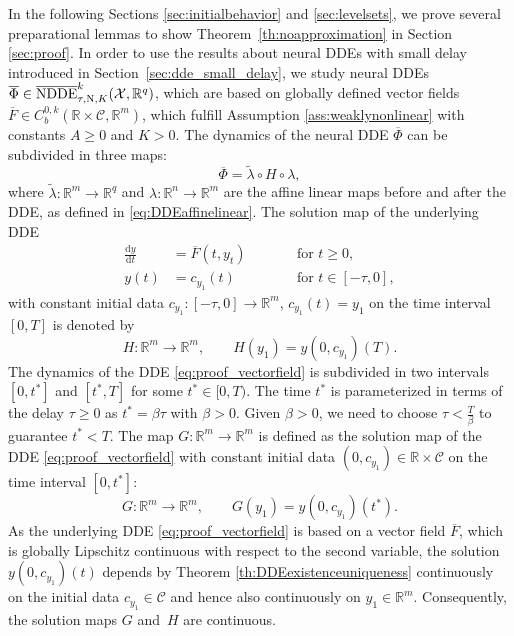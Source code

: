 \documentclass[10pt]{article}
\numberwithin{equation}{section}
\newcommand*{\dd}{\mathrm{d}}
\begin{document}
	In the following Sections \ref{sec:initialbehavior} and \ref{sec:levelsets}, we prove several preparational lemmas to show Theorem~\ref{th:noapproximation} in Section \ref{sec:proof}. In order to use the results about neural DDEs with small delay introduced in Section~\ref{sec:dde_small_delay}, we study neural DDEs  $\overline{\Phi}\in \overline{\textup{NDDE}}_{\tau,\textup{N},K}^k(\mathcal{X},\mathbb{R}^q)$, which are based on globally defined vector fields $\overline{F}\in C_b^{0,k}(\mathbb{R}\times \mathcal{C},\mathbb{R}^m)$, which fulfill Assumption \ref{ass:weaklynonlinear} with constants $A\geq 0$ and $K>0$. The dynamics of the neural DDE $\overline{\Phi}$ can be subdivided in three maps:
	\begin{equation*}
		\overline\Phi = \tilde\lambda \circ H  \circ \lambda,
	\end{equation*}
	where $\tilde \lambda: \mathbb{R}^m \rightarrow \mathbb{R}^q$ and $\lambda: \mathbb{R}^n \rightarrow \mathbb{R}^m$ are the affine linear maps before and after the DDE, as defined in \eqref{eq:DDEaffinelinear}. The solution map of the underlying DDE 
	\begin{equation}\label{eq:proof_vectorfield}
		\begin{aligned}
			\frac{\dd y}{\dd t} &= \overline  F(t,y_t) \qquad &&\text{for } t\geq 0, \\  
			y(t) &= c_{y_1}(t) &&\text{for } t \in [-\tau,0],
		\end{aligned}
	\end{equation}
	with constant initial data $c_{y_1}:[-\tau,0]\rightarrow \mathbb{R}^m$, $c_{y_1}(t) = y_1$ on the time interval $[0,T]$ is denoted by
	\begin{equation} \label{eq:mapH}
		H:  \mathbb{R}^m \rightarrow \mathbb{R}^m, \qquad H(y_1) =y(0,c_{y_1})(T).
	\end{equation}
	The dynamics of the DDE \eqref{eq:proof_vectorfield} is subdivided in two intervals $[0,t^\ast]$ and $[t^\ast,T]$ for some $t^\ast\in[0,T)$. The time $t^\ast$ is parameterized in terms of the delay $\tau\geq 0$ as $t^\ast = \beta \tau$ with $\beta>0$.  Given $\beta>0$, we need to choose $\tau<\frac{T}{\beta}$ to guarantee $t^\ast<T$. The map $G: \mathbb{R}^m \rightarrow \mathbb{R}^m$ is defined as the solution map of the DDE \eqref{eq:proof_vectorfield}  with constant initial data $(0,c_{y_1}) \in \mathbb{R} \times \mathcal{C}$ on the time interval $[0,t^\ast]$:
	\begin{equation} \label{eq:mapG}
		G: \mathbb{R}^m \rightarrow \mathbb{R}^m, \qquad G(y_1) = y(0,c_{y_1})(t^\ast).
	\end{equation}
	As the underlying DDE \eqref{eq:proof_vectorfield} is based on a vector field $\overline{F}$, which is globally Lipschitz continuous with respect to the second variable, the solution $y(0,c_{y_1})(t)$ depends by Theorem \ref{th:DDEexistenceuniqueness} continuously on the initial data $c_{y_1}\in\mathcal{C}$ and hence also continuously on $y_1\in \mathbb{R}^m$. Consequently, the solution maps $G$ and~$H$ are continuous. 
	
\end{document}
